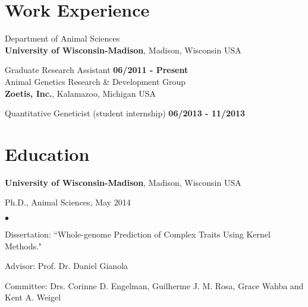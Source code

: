 \documentclass[margin,line,10pt]{res}
\newenvironment{list1}{
  \begin{list}{\ding{113}}{%
      \setlength{\itemsep}{0in}
      \setlength{\parsep}{0in} \setlength{\parskip}{0in}
      \setlength{\topsep}{0in} \setlength{\partopsep}{0in} 
      \setlength{\leftmargin}{0.17in}}}{\end{list}}
\newenvironment{list2}{
  \begin{list}{$\bullet$}{%
      \setlength{\itemsep}{0in}
      \setlength{\parsep}{0in} \setlength{\parskip}{0in}
      \setlength{\topsep}{0in} \setlength{\partopsep}{0in} 
      \setlength{\leftmargin}{0.2in}}}{\end{list}}
\begin{document}
\begin{resume}
\begin{comment}
\section{\sc Professional   Appointments}
Affiliate Faculty Member \\
Department of xxx\\
{\bf University of Nebraska-Lincoln}, Lincoln, Nebraska USA
\end{comment}


\section{\sc Work \phantom{1cm} Experience}
Department of Animal Sciences\\
{\bf University of Wisconsin-Madison}, Madison, Wisconsin USA


\vspace{-.3cm}

Graduate Research Assistant   \hfill {\bf 06/2011 - Present}\\


Animal Genetics Research \& Development  Group \\
{\bf Zoetis, Inc.}, Kalamazoo, Michigan USA

\vspace{-.3cm}

Quantitative Geneticist (student internship)   \hfill {\bf 06/2013 - 11/2013}\\



\section{\sc Education}

{\bf University of Wisconsin-Madison}, Madison, Wisconsin USA\\
\vspace*{-.1in}
\begin{list1}
\item[] Ph.D., Animal Sciences, May 2014
\begin{list2}
\vspace*{.05in}
\item Dissertation: ``Whole-genome Prediction of Complex Traits Using Kernel Methods." 
\item Advisor: Prof. Dr. Daniel Gianola 
\item Committee: Drs. Corinne D. Engelman, Guilherme J. M. Rosa, Grace Wahba and Kent A. Weigel
\end{list2}
\vspace*{.05in}
\end{list1}






\end{resume}
\end{document}
